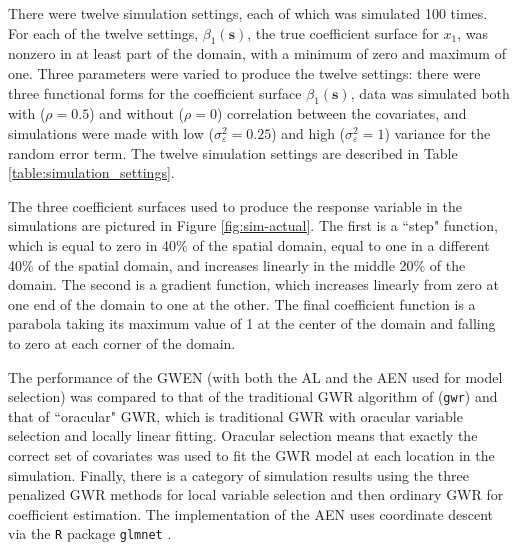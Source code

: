 \documentclass[authoryear, review, 11pt]{elsarticle}
\begin{document}
	There were twelve simulation settings, each of which was simulated 100 times. For each of the twelve settings, $\beta_1(\bm{s})$, the true coefficient surface for $x_1$, was nonzero in at least part of the domain, with a minimum of zero and maximum of one. Three parameters were varied to produce the twelve settings: there were three functional forms for the coefficient surface $\beta_1(\bm{s})$, data was simulated both with ($\rho = 0.5$) and without ($\rho = 0$) correlation between the covariates, and simulations were made with low ($\sigma_\varepsilon^2 = 0.25$) and high ($\sigma_\varepsilon^2 = 1$) variance for the random error term. The twelve simulation settings are described in Table \ref{table:simulation_settings}.
	
	The three coefficient surfaces used to produce the response variable in the simulations are pictured in Figure \ref{fig:sim-actual}. The first is a ``step" function, which is equal to zero in 40\% of the spatial domain, equal to one in a different 40\% of the spatial domain, and increases linearly in the middle 20\% of the domain. The second is a gradient function, which increases linearly from zero at one end of the domain to one at the other. The final coefficient function is a parabola taking its maximum value of 1 at the center of the domain and falling to zero at each corner of the domain.
	
	The performance of the GWEN (with both the AL and the AEN used for model selection) was compared to that of the traditional GWR algorithm of \cite{Fotheringham:2002} ({\tt gwr}) and that of ``oracular" GWR, which is traditional GWR with oracular variable selection and locally linear fitting. Oracular selection means that exactly the correct set of covariates was used to fit the GWR model at each location in the simulation. Finally, there is a category of simulation results using the three penalized GWR methods for local variable selection and then ordinary GWR for coefficient estimation. The implementation of the AEN uses coordinate descent via the {\tt R} package {\tt glmnet} \citep{Friedman:2010}.
	
\end{document}
